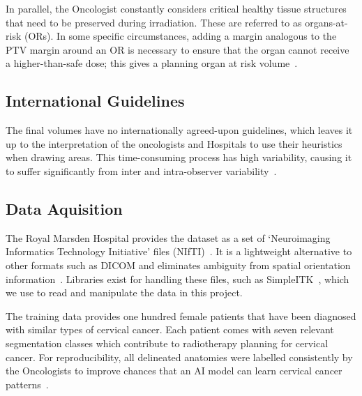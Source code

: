 \documentclass[12pt,twoside]{report}
\begin{document}
In parallel, the Oncologist constantly considers critical healthy tissue structures that need to be preserved during irradiation. These are referred to as organs-at-risk (ORs). In some specific circumstances, adding a margin analogous to the PTV margin around an OR is necessary to ensure that the organ cannot receive a higher-than-safe dose; this gives a planning organ at risk volume~\cite{defining-target-volumes}.

\subsection{International Guidelines}

The final volumes have no internationally agreed-upon guidelines, which leaves it up to the interpretation of the oncologists and Hospitals to use their heuristics when drawing areas. This time-consuming process has high variability, causing it to suffer significantly from inter and intra-observer variability~\cite{Lin2021-oz}. 


\subsection{Data Aquisition}

The Royal Marsden Hospital provides the dataset as a set of `Neuroimaging Informatics Technology Initiative' files (NIfTI)~\cite{file-formats}. It is a lightweight alternative to other formats such as DICOM and eliminates ambiguity from spatial orientation information~\cite{dicom-to-nifti-conversion}. Libraries exist for handling these files, such as SimpleITK~\cite{SimpleITK-paper}, which we use to read and manipulate the data in this project. %

The training data provides one hundred female patients that have been diagnosed with similar types of cervical cancer. Each patient comes with seven relevant segmentation classes which contribute to radiotherapy planning for cervical cancer. For reproducibility, all delineated anatomies were labelled consistently by the Oncologists to improve chances that an AI model can learn cervical cancer patterns~\cite{AMLART-data}. 
\end{document}
